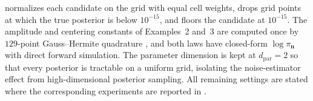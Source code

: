 \documentclass[review,hidelinks,onefignum,onetabnum]{siamart251216}
\newcommand{\vn}{\bm{n}}
\begin{document}
 normalizes each candidate on the grid with equal cell weights, drops grid points at which the true posterior is below $10^{-15}$, and floors the candidate at $10^{-15}$.
The amplitude and centering constants of Examples~2 and~3 are computed once by $129$-point Gauss--Hermite quadrature \cite{GolubWelsch1969}, and both laws have closed-form $\log\pi_{\vn}$ with direct forward simulation. The parameter dimension is kept at $d_{\mathrm{par}} = 2$ so that every posterior is tractable on a uniform grid, isolating the noise-estimator effect from high-dimensional posterior sampling. All remaining settings are stated where the corresponding experiments are reported in .


\end{document}
